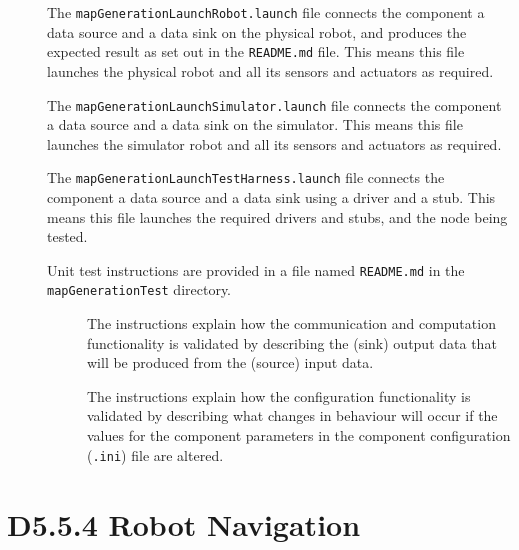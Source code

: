 \documentclass{CSSRforAfrica}
\newcommand{\checkboxChecked}{\fbox{\ding{51}}} %
\newcommand{\checkboxDashed}{\fbox{--}}         %
\begin{document}
\begin{description}
\item[\checkboxDashed] The {\small \verb+mapGenerationLaunchRobot.launch+} file  connects the component a data source and a data sink on the physical robot, and produces the expected result as set out in the  {\small \verb+README.md+}  file.    This means this file launches the physical robot and all its sensors and actuators as required.

\item[\checkboxDashed] The {\small \verb+mapGenerationLaunchSimulator.launch+} file  connects the component a data source and a data sink on the simulator.   This means this file launches the simulator robot and all its sensors and actuators as required.

\item[\checkboxChecked] The {\small \verb+mapGenerationLaunchTestHarness.launch+} file  connects the component a data source and a data sink using a driver and a stub.   This means this file launches the required drivers and stubs, and the node being tested.

\item[\checkboxChecked] Unit test instructions are provided in a file named {\small \verb+README.md+} in the  {\small \verb+mapGenerationTest+} directory. 


\begin{description}

\item[\checkboxChecked] The instructions explain how the communication and computation functionality is validated by describing the (sink) output data that will be produced from the (source) input data.  

\item[\checkboxChecked] The instructions explain how the configuration functionality is validated by describing what changes in behaviour will occur if the values for the component parameters in the component configuration ({\small \verb+.ini+}) file are altered.

\end{description}
\end{description}
\newpage




\section{D5.5.4 Robot Navigation}
\end{document}
